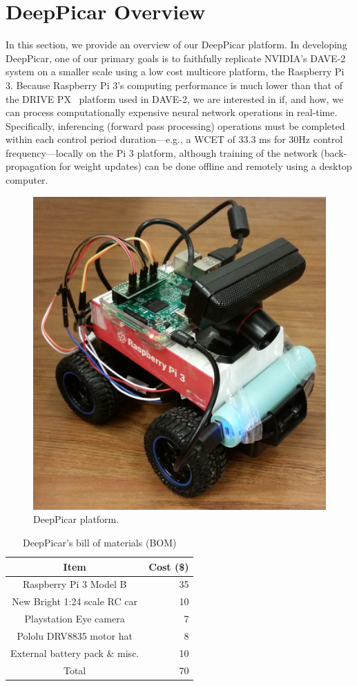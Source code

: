 
\section{DeepPicar Overview}\label{sec:overview}

In this section, we provide an overview of our DeepPicar platform.
In developing DeepPicar, one of our primary goals is to faithfully
replicate NVIDIA's DAVE-2 system on a smaller scale using a low cost
multicore platform, the Raspberry Pi 3. Because Raspberry Pi 3's
computing performance is much lower than that of the DRIVE
PX~\cite{drivepx} platform used in DAVE-2, we are interested in if,
and how, we can process 
computationally expensive neural network operations in
real-time. Specifically, inferencing (forward pass processing)
operations must be completed within each control period
duration---e.g., a WCET of 33.3 ms for 30Hz control 
frequency---locally on the Pi 3 platform, although training of the 
network (back-propagation for weight updates) can be done offline and 
remotely using a desktop computer.

\begin{figure}[h]
  \centering
  \includegraphics[width=.4\textwidth]{figs/DeepPicar_platform}
  \caption{DeepPicar platform.}
  \label{fig:overview}
\end{figure}

\begin{table}[h]
  \centering
  \begin{tabular}{|c|r|}
    \hline
    Item                    & Cost (\$) \\
    \hline
    Raspberry Pi 3 Model B  & 35 \\
    New Bright 1:24 scale RC car       & 10 \\
    Playstation Eye camera  &  7 \\
    Pololu DRV8835 motor hat&  8 \\
    External battery pack \& misc.   & 10 \\
    \hline
    Total                   & 70 \\
    \hline
  \end{tabular}
  \caption{DeepPicar's bill of materials (BOM)}
  \label{tbl:carbom}
\end{table}

